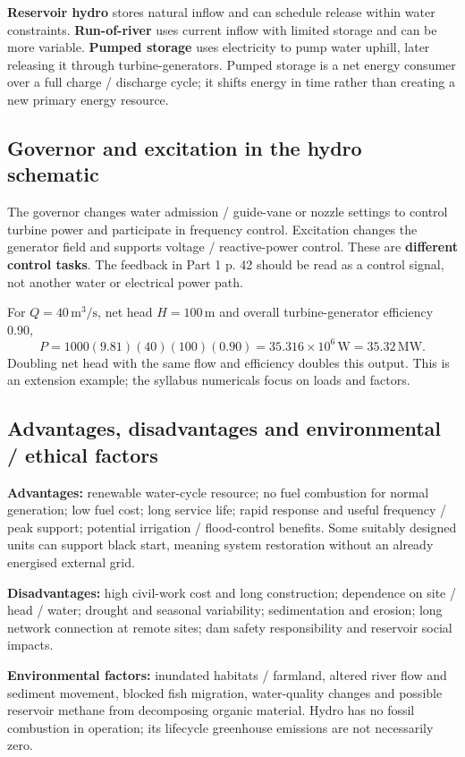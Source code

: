 \documentclass[11pt,a4paper]{article}
\newenvironment{Worked}[1]{\begin{tcolorbox}[breakable=false,colback=white,colframe=teal,colbacktitle=pale,coltitle=ink,title={#1}]}{\end{tcolorbox}}
\begin{document}
\textbf{Reservoir hydro} stores natural inflow and can schedule release within water constraints. \textbf{Run-of-river} uses current inflow with limited storage and can be more variable. \textbf{Pumped storage} uses electricity to pump water uphill, later releasing it through turbine-generators. Pumped storage is a net energy consumer over a full charge / discharge cycle; it shifts energy in time rather than creating a new primary energy resource.

\subsection{Governor and excitation in the hydro schematic}
The governor changes water admission / guide-vane or nozzle settings to control turbine power and participate in frequency control. Excitation changes the generator field and supports voltage / reactive-power control. These are \textbf{different control tasks}. The feedback in Part 1 p. 42 should be read as a control signal, not another water or electrical power path.

\begin{Worked}{Understanding example: power from a water flow}
For $Q=40\,\mathrm{m^3/s}$, net head $H=100\,\mathrm{m}$ and overall turbine-generator efficiency 0.90,
\[
P=1000(9.81)(40)(100)(0.90)=35.316\times10^6\,\mathrm{W}
=35.32\,\mathrm{MW}.
\]
Doubling net head with the same flow and efficiency doubles this output. This is an extension example; the syllabus numericals focus on loads and factors.
\end{Worked}

\subsection{Advantages, disadvantages and environmental / ethical factors}
\textbf{Advantages:} renewable water-cycle resource; no fuel combustion for normal generation; low fuel cost; long service life; rapid response and useful frequency / peak support; potential irrigation / flood-control benefits. Some suitably designed units can support black start, meaning system restoration without an already energised external grid.

\textbf{Disadvantages:} high civil-work cost and long construction; dependence on site / head / water; drought and seasonal variability; sedimentation and erosion; long network connection at remote sites; dam safety responsibility and reservoir social impacts.

\textbf{Environmental factors:} inundated habitats / farmland, altered river flow and sediment movement, blocked fish migration, water-quality changes and possible reservoir methane from decomposing organic material. Hydro has no fossil combustion in operation; its lifecycle greenhouse emissions are not necessarily zero.
\end{document}
